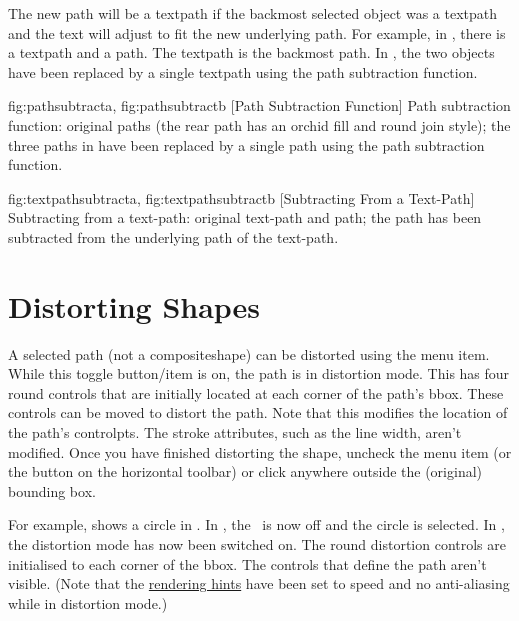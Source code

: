The new path will be a \gls*{textpath} if the backmost selected
object was a \gls*{textpath} and the text will adjust to fit the
new underlying path. For example, in
, there is a \gls*{textpath}
and a \gls*{path}. The \gls*{textpath} is the backmost path.
In , the two objects have
been replaced by a single \gls*{textpath} using the path subtraction
function.

{
  {fig:pathsubtracta}{}{},
  {fig:pathsubtractb}{}{}
}
[Path Subtraction Function]
{Path subtraction function:
 original paths (the rear path 
has an orchid fill  and round join style);
 the three paths 
in  have
been replaced by a single path using the path subtraction function.}

{
  {fig:textpathsubtracta}{}{},
  {fig:textpathsubtractb}{}{}
}
[Subtracting From a Text-Path]
{Subtracting from a text-path: 
 original text-path and path; 
 the path has been 
subtracted from the underlying path of the text-path.}


\section{Distorting Shapes}\label{sec:distort}


A selected \gls{path} (not a \gls{compositeshape}) can be distorted using the
 menu item. While this toggle
button\slash item is on, the \gls{path} is in distortion mode.
This has four round controls that are initially located at each
corner of the path's \gls{bbox}. These controls can be moved to
distort the path.  Note that this modifies the location of the
path's \glspl{controlpt}. The stroke attributes, such as the line
width, aren't modified. Once you have finished distorting the shape,
uncheck the  menu item (or the
button on the horizontal \gls{toolbar}) or click
anywhere outside the (original) bounding box.

For example,  shows a circle in 
\editpathmode. In , the \editpathmode\ is now off and
the circle is selected. In , the
distortion mode has now been switched on. The round distortion
controls are initialised to each corner of the \gls{bbox}. The
controls that define the path aren't visible. (Note that the
\hyperref[sec:graphics]{rendering hints} have been set to speed
and no anti-aliasing while in distortion mode.)

